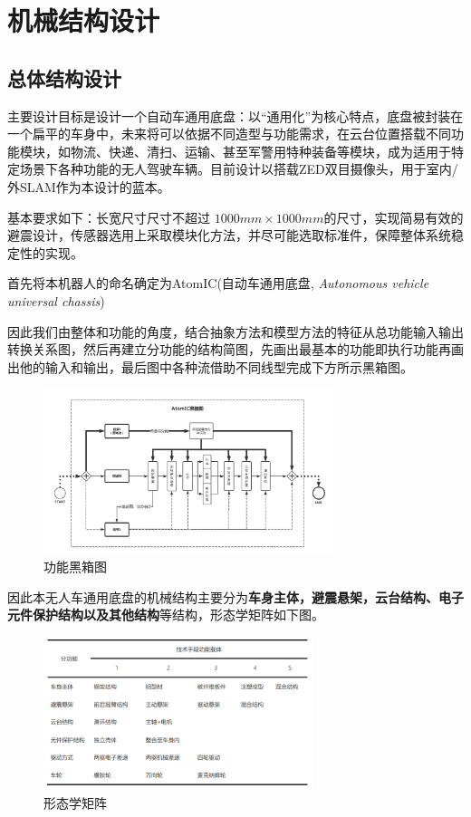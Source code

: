 \newpage

\section{机械结构设计}

\subsection{总体结构设计}

主要设计目标是设计一个自动车通用底盘：以“通用化”为核心特点，底盘被封装在一个扁平的车身中，未来将可以依据不同造型与功能需求，在云台位置搭载不同功能模块，如物流、快递、清扫、运输、甚至军警用特种装备等模块，成为适用于特定场景下各种功能的无人驾驶车辆。目前设计以搭载ZED双目摄像头，用于室内/外SLAM作为本设计的蓝本。

基本要求如下：长宽尺寸尺寸不超过 $ 1000mm \times 1000mm $的尺寸，实现简易有效的避震设计，传感器选用上采取模块化方法，并尽可能选取标准件，保障整体系统稳定性的实现。

首先将本机器人的命名确定为AtomIC(自动车通用底盘, \emph{Autonomous vehicle universal chassis})

因此我们由整体和功能的角度，结合抽象方法和模型方法的特征从总功能输入输出转换关系图，然后再建立分功能的结构简图，先画出最基本的功能即执行功能再画出他的输入和输出，最后图中各种流借助不同线型完成下方所示黑箱图。

\begin{figure}[htbp]
	\centering
	\includegraphics[width = 0.75\textwidth]{fig/hxt.png}
	\caption{功能黑箱图}
	\label{hxt}
\end{figure}

因此本无人车通用底盘的机械结构主要分为\textbf{车身主体，避震悬架，云台结构、电子元件保护结构以及其他结构}等结构，形态学矩阵如下图。

\begin{figure}[htbp]
	\centering
	\includegraphics[width = 0.7\textwidth]{fig/xtxjz.png}
	\caption{形态学矩阵}
	\label{xtxjz}
\end{figure}

